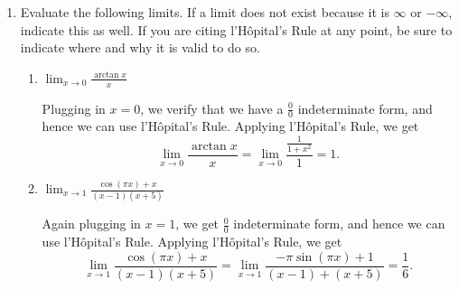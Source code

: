 \documentclass{article}
\begin{document}
\begin{enumerate}
\begin{enumerate}
\item Let $B(x)=\displaystyle\int_2^x f(t)\,dt$. Simplify $B(x) - A(x)$ as much as possible.  Explain your reasoning.  Give a numerical answer if possible. 
\probonly{\vspace{1 in}}

\begin{solution}
Using the properties of the area function and integrals we get $$B(x) - A(x)= \int_2^x f(t) dt- \int_3^x f(t)dt=\int_2^3 f(t)dt=5$$
\end{solution}

\item Is $A(2)$ positive? Explain your reasoning. 

\begin{solution}
Using the properties of integrals and the previous part we get:

$A(2)=\displaystyle \int_3^2 f(t) dt = -\int_2^3 f(t) dt =-5$, so  $A(2)$ is not positive.
\end{solution}

\end{enumerate} 



\probonly{\newpage}
\item Evaluate the following limits. If a limit does not exist because it is $\infty$ or $-\infty$, indicate this as well.  If you are citing l'H\^opital's Rule at any point, be sure to indicate where and why it is valid to do so.

\begin{enumerate}
\item $\displaystyle \lim_{x\to 0} \frac{\arctan x}{x}$

\begin{solution}
Plugging in $x=0$, we verify that we have a $\frac{0}{0}$ indeterminate form, and hence we can use l'H\^opital's Rule. Applying l'H\^opital's Rule, we get $$\lim_{x\to 0} \displaystyle\frac{\arctan x}{x}=\lim_{x\to0} \frac{\frac{1}{1+x^2}}{1}=1.$$
\end{solution}

\vfill 

\item $\displaystyle \lim_{x\to 1}\frac{\cos(\pi x) +x}{(x-1)(x+5)}$


\begin{solution}
Again plugging in $x=1$, we get $\frac{0}{0}$ indeterminate form, and hence we can use l'H\^opital's Rule. Applying l'H\^opital's Rule, we get $$\lim_{x\to 1}\frac{\cos(\pi x) +x}{(x-1)(x+5)}=\lim_{x\to 1}\frac{-\pi \sin(\pi x) +1}{(x-1)+(x+5)}=\frac{1}{6}.$$
\end{solution}



\end{enumerate}
\end{enumerate}
\end{document}

